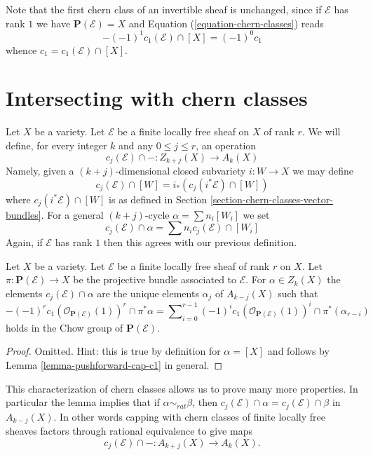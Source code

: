 \noindent
Note that the first chern class of an invertible
sheaf is unchanged, since if $\mathcal{E}$ has rank $1$ we have
$\mathbf{P}(\mathcal{E}) = X$ and Equation (\ref{equation-chern-classes})
reads
$$
-(-1)^1 c_1(\mathcal{E}) \cap [X] = (-1)^0 c_1
$$
whence $c_1 = c_1(\mathcal{E}) \cap [X]$.




\section{Intersecting with chern classes}
\label{section-intersecting-chern-classes}

\noindent
Let $X$ be a variety. Let $\mathcal{E}$ be a finite locally free sheaf on $X$
of rank $r$. We will define, for every integer $k$ and any
$0 \leq j \leq r$, an operation
$$
c_j(\mathcal{E}) \cap - :
Z_{k + j}(X) \to A_k(X)
$$
Namely, given a $(k + j)$-dimensional closed subvariety
$i : W \to X$ we may define
$$
c_j(\mathcal{E}) \cap [W] = i_*(c_j({i^*\mathcal{E}}) \cap [W])
$$
where $c_j({i^*\mathcal{E}}) \cap [W]$ is as defined in
Section \ref{section-chern-classes-vector-bundles}.
For a general $(k + j)$-cycle $\alpha = \sum n_i [W_i]$ we set
$$
c_j(\mathcal{E}) \cap \alpha = \sum n_i c_j(\mathcal{E}) \cap [W_i]
$$
Again, if $\mathcal{E}$ has rank $1$ then this agrees with our
previous definition.

\begin{lemma}
\label{lemma-determine-intersections}
Let $X$ be a variety.
Let $\mathcal{E}$ be a finite locally free sheaf of rank $r$ on $X$.
Let $\pi : \mathbf{P}(\mathcal{E}) \to X$ be the projective bundle
associated to $\mathcal{E}$.
For $\alpha \in Z_k(X)$ the elements
$c_j(\mathcal{E}) \cap \alpha$ are the unique elements
$\alpha_j$ of $A_{k - j}(X)$
such that
$$
-(-1)^r c_1(\mathcal{O}_{\mathbf{P}(\mathcal{E})}(1))^r \cap \pi^*\alpha
=
\sum\nolimits_{i = 0}^{r - 1}
(-1)^i c_1(\mathcal{O}_{\mathbf{P}(\mathcal{E})}(1))^i \cap
\pi^*(\alpha_{r - i})
$$
holds in the Chow group of $\mathbf{P}(\mathcal{E})$.
\end{lemma}

\begin{proof}
Omitted. Hint: this is true by definition for
$\alpha = [X]$ and follows by Lemma \ref{lemma-pushforward-cap-c1}
in general.
\end{proof}

\noindent
This characterization of chern classes allows us to prove many more
properties. In particular the lemma implies that
if $\alpha \sim_{rat} \beta$, then
$c_j(\mathcal{E}) \cap \alpha = c_j(\mathcal{E}) \cap \beta$
in $A_{k - j}(X)$. In other words capping with chern classes of
finite locally free sheaves factors through rational equivalence
to give maps
$$
c_j(\mathcal{E}) \cap - :
A_{k + j}(X) \to A_k(X).
$$


